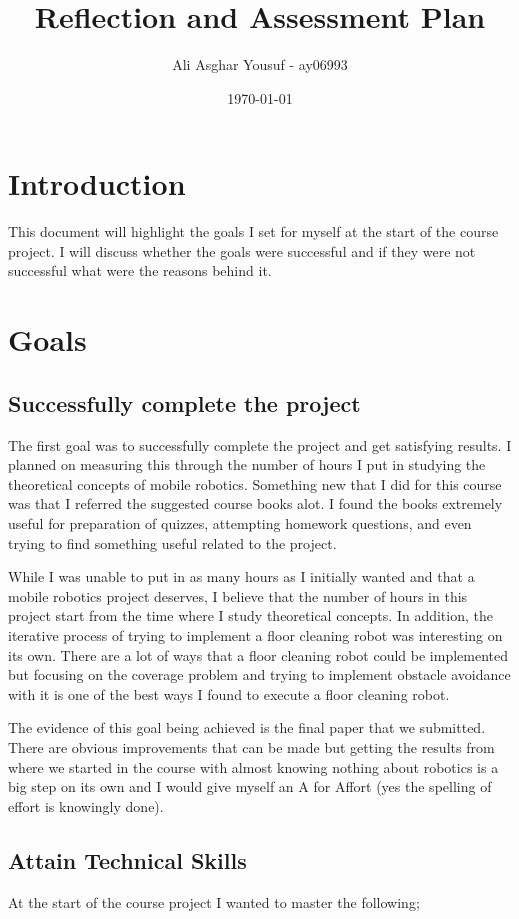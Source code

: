 \documentclass[12pt]{article}
\title{Reflection and Assessment Plan}
\author{Ali Asghar Yousuf - ay06993}
\date{\today}
\begin{document}
\maketitle

\section*{Introduction}
This document will highlight the goals I set for myself at the start of the course project. I will discuss whether the goals were successful and if they were not successful what were the reasons behind it.

\section*{Goals}
\subsection*{Successfully complete the project}
The first goal was to successfully complete the project and get satisfying
results. I planned on measuring this through the number of hours I put in
studying the theoretical concepts of mobile robotics. Something new that I did
for this course was that I referred the suggested course books alot. I found
the books extremely useful for preparation of quizzes, attempting homework
questions, and even trying to find something useful related to the project.

While I was unable to put in as many hours as I initially wanted and that a
mobile robotics project deserves, I believe that the number of hours in this
project start from the time where I study theoretical concepts. In addition,
the iterative process of trying to implement a floor cleaning robot was
interesting on its own. There are a lot of ways that a floor cleaning robot
could be implemented but focusing on the coverage problem and trying to
implement obstacle avoidance with it is one of the best ways I found to
execute a floor cleaning robot.

The evidence of this goal being achieved is the final paper that we submitted.
There are obvious improvements that can be made but getting the results from
where we started in the course with almost knowing nothing about robotics is a
big step on its own and I would give myself an A for Affort (yes the spelling of
effort is knowingly done).

\subsection*{Attain Technical Skills}
At the start of the course project I wanted to master the following;
\end{document}
